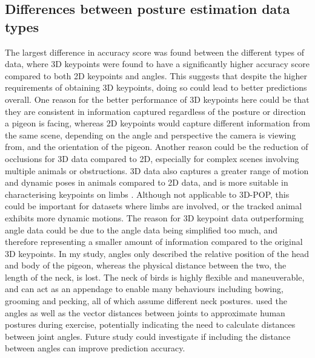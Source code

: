 \documentclass[11pt, letterpaper]{article} %
\begin{document}
\subsection{Differences between posture estimation data types}
\noindent The largest difference in accuracy score was found between the different types of data, where 3D keypoints were found to have a significantly higher accuracy score compared to both 2D keypoints and angles. This suggests that despite the higher requirements of obtaining 3D keypoints, doing so could lead to better predictions overall. One reason for the better performance of 3D keypoints here could be that they are consistent in information captured regardless of the posture or direction a pigeon is facing, whereas 2D keypoints would capture different information from the same scene, depending on the angle and perspective the camera is viewing from, and the orientation of the pigeon. Another reason could be the reduction of occlusions for 3D data compared to 2D, especially for complex scenes involving multiple animals or obstructions. 3D data also captures a greater range of motion and dynamic poses in animals compared to 2D data, and is more suitable in characterising keypoints on limbs \citep{datta_computational_2019}. Although not applicable to 3D-POP, this could be important for datasets where limbs are involved, or the tracked animal exhibits more dynamic motions. 
%
The reason for 3D keypoint data outperforming angle data could be due to the angle data being simplified too much, and therefore representing a smaller amount of information compared to the original 3D keypoints. In my study, angles only described the relative position of the head and body of the pigeon, whereas the physical distance between the two, the length of the neck, is lost. The neck of birds is highly flexible and maneuverable, and can act as an appendage to enable many behaviours \citep{neck_2023} including bowing, grooming and pecking, all of which assume different neck postures. \citet{human_angles_2020} used the angles as well as the vector distances between joints to approximate human postures during exercise, potentially indicating the need to calculate distances between joint angles. Future study could investigate if including the distance between angles can improve prediction accuracy. \\
\end{document}
